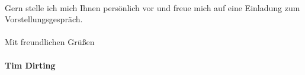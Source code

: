 \documentclass[12pt,twoside,a4paper]{scrlttr2}
\begin{document}
\begin{letter}
\begin{flushleft}
		
			\,\\
			Gern stelle ich mich Ihnen persönlich vor und freue mich auf eine Einladung zum Vorstellungsgespräch.\\
			\, \\
			Mit freundlichen Grüßen\\
			
			\textbf{\\Tim Dirting}		
	
			\end{flushleft}
			
		
		\begin{onehalfspace}
		
			
		\end{onehalfspace}
		
		
	\end{letter}
	
\end{document}
